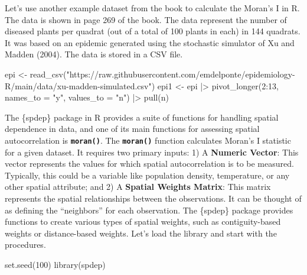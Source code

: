 \documentclass[
  letterpaper,
]{book}
\newenvironment{Shaded}{\begin{snugshade}}{\end{snugshade}}
\newcommand{\AttributeTok}[1]{\textcolor[rgb]{0.40,0.45,0.13}{#1}}
\newcommand{\DecValTok}[1]{\textcolor[rgb]{0.68,0.00,0.00}{#1}}
\newcommand{\FunctionTok}[1]{\textcolor[rgb]{0.28,0.35,0.67}{#1}}
\newcommand{\NormalTok}[1]{\textcolor[rgb]{0.00,0.23,0.31}{#1}}
\newcommand{\OtherTok}[1]{\textcolor[rgb]{0.00,0.23,0.31}{#1}}
\newcommand{\SpecialCharTok}[1]{\textcolor[rgb]{0.37,0.37,0.37}{#1}}
\newcommand{\StringTok}[1]{\textcolor[rgb]{0.13,0.47,0.30}{#1}}
\begin{document}
Let's use another example dataset from the book to calculate the Moran's
I in R. The data is shown in page 269 of the book. The data represent
the number of diseased plants per quadrat (out of a total of 100 plants
in each) in 144 quadrats. It was based on an epidemic generated using
the stochastic simulator of Xu and Madden (2004). The data is stored in
a CSV file.

\begin{Shaded}
\begin{Highlighting}[]
\NormalTok{epi }\OtherTok{\textless{}{-}} \FunctionTok{read\_csv}\NormalTok{(}\StringTok{"https://raw.githubusercontent.com/emdelponte/epidemiology{-}R/main/data/xu{-}madden{-}simulated.csv"}\NormalTok{)}
\NormalTok{epi1 }\OtherTok{\textless{}{-}}\NormalTok{ epi }\SpecialCharTok{|\textgreater{}}
  \FunctionTok{pivot\_longer}\NormalTok{(}\DecValTok{2}\SpecialCharTok{:}\DecValTok{13}\NormalTok{,}
               \AttributeTok{names\_to =} \StringTok{"y"}\NormalTok{,}
               \AttributeTok{values\_to =} \StringTok{"n"}\NormalTok{) }\SpecialCharTok{|\textgreater{}}
  \FunctionTok{pull}\NormalTok{(n)}
\end{Highlighting}
\end{Shaded}

The \{spdep\} package in R provides a suite of functions for handling
spatial dependence in data, and one of its main functions for assessing
spatial autocorrelation is \textbf{\texttt{moran()}}. The
\textbf{\texttt{moran()}} function calculates Moran's I statistic for a
given dataset. It requires two primary inputs: 1) A \textbf{Numeric
Vector}: This vector represents the values for which spatial
autocorrelation is to be measured. Typically, this could be a variable
like population density, temperature, or any other spatial attribute;
and 2) A \textbf{Spatial Weights Matrix}: This matrix represents the
spatial relationships between the observations. It can be thought of as
defining the ``neighbors'' for each observation. The \{spdep\} package
provides functions to create various types of spatial weights, such as
contiguity-based weights or distance-based weights. Let's load the
library and start with the procedures.\\

\begin{Shaded}
\begin{Highlighting}[]
\FunctionTok{set.seed}\NormalTok{(}\DecValTok{100}\NormalTok{)}
\FunctionTok{library}\NormalTok{(spdep)}
\end{Highlighting}
\end{Shaded}
\end{document}
